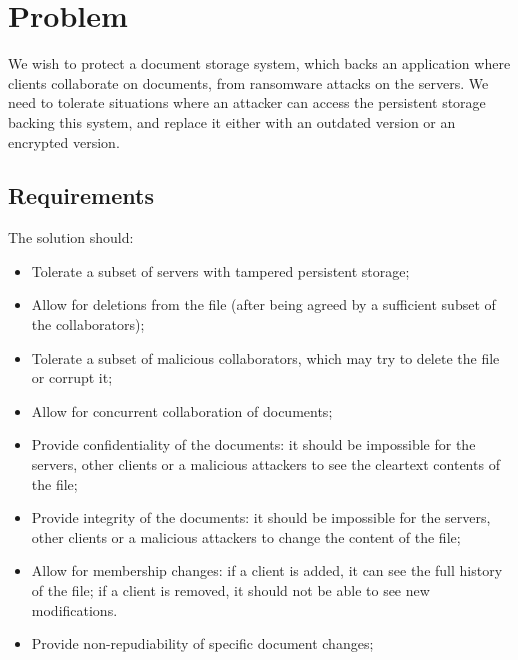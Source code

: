 \section{Problem}

We wish to protect a document storage system, which backs an
application where clients collaborate on documents, from
ransomware attacks on the servers. We need to tolerate situations
where an attacker can access the persistent storage backing this
system, and replace it either with an outdated version or an
encrypted version.

\subsection{Requirements}
The solution should:
\begin{itemize}
    \setlength{\itemsep}{0pt}
    \setlength{\parskip}{0pt}
    \setlength{\parsep}{0pt}
    \item Tolerate a subset of servers with tampered
        persistent storage;
    \item Allow for deletions from the file (after being
        agreed by a sufficient subset of the collaborators);
    \item Tolerate a subset of malicious collaborators, which
        may try to delete the file or corrupt it;
    \item Allow for concurrent collaboration of documents;
    \item Provide confidentiality of the documents: it should
        be impossible for the servers, other clients or a
        malicious attackers to see the cleartext contents of
        the file;
    \item Provide integrity of the documents: it should
        be impossible for the servers, other clients or a
        malicious attackers to change the content of
        the file;
    \item Allow for membership changes: if a client is added,
        it can see the full history of the file; if a client
        is removed, it should not be able to see new
        modifications.
    \item Provide non-repudiability of specific document changes;
\end{itemize}

\newpage

